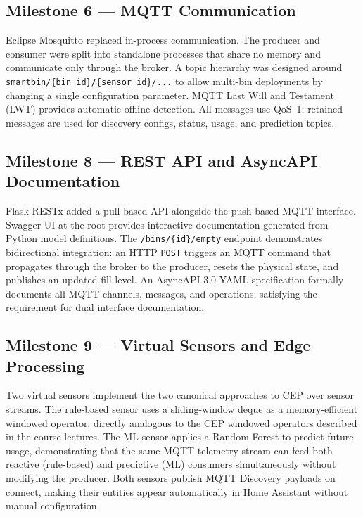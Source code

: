 \documentclass[10pt,a4paper]{article}
\begin{document}
\subsection{Milestone 6 --- MQTT Communication}

Eclipse Mosquitto replaced in-process communication. The producer and consumer were
split into standalone processes that share no memory and communicate only through the
broker. A topic hierarchy was designed around
\texttt{smartbin/\{bin\_id\}/\{sensor\_id\}/...} to allow multi-bin deployments by
changing a single configuration parameter. MQTT Last Will and Testament (LWT) provides
automatic offline detection. All messages use QoS~1; retained messages are used for
discovery configs, status, usage, and prediction topics.

\subsection{Milestone 8 --- REST API and AsyncAPI Documentation}

Flask-RESTx added a pull-based API alongside the push-based MQTT interface. Swagger UI
at the root provides interactive documentation generated from Python model definitions.
The \texttt{/bins/\{id\}/empty} endpoint demonstrates bidirectional integration: an HTTP
\texttt{POST} triggers an MQTT command that propagates through the broker to the
producer, resets the physical state, and publishes an updated fill level. An AsyncAPI
3.0 YAML specification formally documents all MQTT channels, messages, and operations,
satisfying the requirement for dual interface documentation.

\subsection{Milestone 9 --- Virtual Sensors and Edge Processing}

Two virtual sensors implement the two canonical approaches to CEP over sensor streams.
The rule-based sensor uses a sliding-window deque as a memory-efficient windowed
operator, directly analogous to the CEP windowed operators described in the course
lectures. The ML sensor applies a Random Forest to predict future usage, demonstrating
that the same MQTT telemetry stream can feed both reactive (rule-based) and predictive
(ML) consumers simultaneously without modifying the producer. Both sensors publish MQTT
Discovery payloads on connect, making their entities appear automatically in Home
Assistant without manual configuration.
\end{document}
